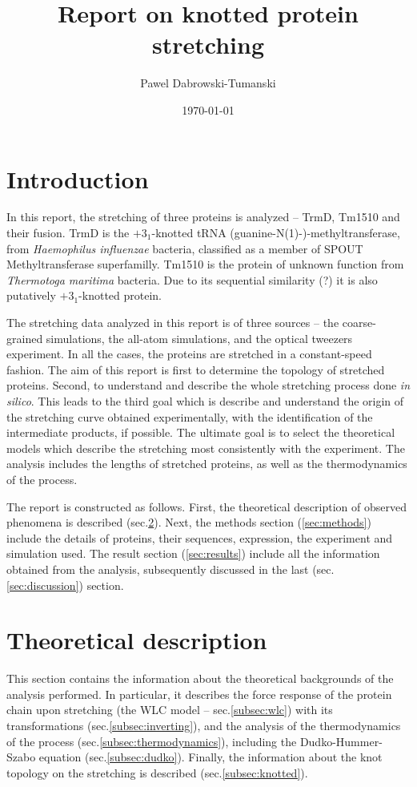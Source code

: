 \documentclass[11pt]{article}
\title{Report on knotted protein stretching}
\author{Pawel Dabrowski-Tumanski}
\date{\today}
\begin{document}
\maketitle

\section{Introduction}
\label{sec:intro}
In this report, the stretching of three proteins is analyzed -- TrmD, Tm1510 and their fusion.
TrmD is the $+3_1$-knotted tRNA (guanine-N(1)-)-methyltransferase, from \textit{Haemophilus influenzae} bacteria, classified as a member of SPOUT Methyltransferase superfamilly.
Tm1510 is the protein of unknown function from \textit{Thermotoga maritima} bacteria.
Due to its sequential similarity (?) it is also putatively $+3_1$-knotted protein.

The stretching data analyzed in this report is of three sources -- the coarse-grained simulations, the all-atom simulations, and the optical tweezers experiment.
In all the cases, the proteins are stretched in a constant-speed fashion.
The aim of this report is first to determine the topology of stretched proteins.
Second, to understand and describe the whole stretching process done \textit{in silico}.
This leads to the third goal which is describe and understand the origin of the stretching curve obtained experimentally, with the identification of the intermediate products, if possible.
The ultimate goal is to select the theoretical models which describe the stretching most consistently with the experiment.
The analysis includes the lengths of stretched proteins, as well as the thermodynamics of the process.

The report is constructed as follows.
First, the theoretical description of observed phenomena is described (sec.\ref{sec:theory}).
Next, the methods section (\ref{sec:methods}) include the details of proteins, their sequences, expression, the experiment and simulation used.
The result section (\ref{sec:results}) include all the information obtained from the analysis, subsequently discussed in the last (sec.\ref{sec:discussion}) section.

\section{Theoretical description}
\label{sec:theory}
This section contains the information about the theoretical backgrounds of the analysis performed.
In particular, it describes the force response of the protein chain upon stretching (the WLC model -- sec.\ref{subsec:wlc}) with its transformations (sec.\ref{subsec:inverting}), and the analysis of the thermodynamics of the process (sec.\ref{subsec:thermodynamics}), including the Dudko-Hummer-Szabo equation (sec.\ref{subsec:dudko}).
Finally, the information about the knot topology on the stretching is described (sec.\ref{subsec:knotted}).
\end{document}

